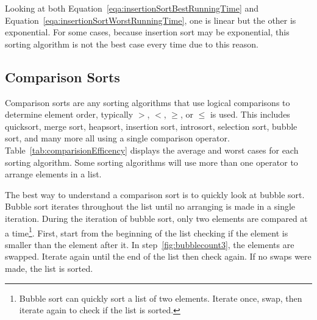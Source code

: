 \documentclass[12pt]{article}
\begin{document}
	Looking at both Equation~\ref{eqa:insertionSortBestRunningTime} and Equation~\ref{eqa:insertionSortWorstRunningTime}, one is linear but the other is exponential.
	For some cases, because insertion sort may be exponential, this sorting algorithm is not the best case every time due to this reason.
	
	\subsection{Comparison Sorts}
	\label{CompSort}
	Comparison sorts are any sorting algorithms that use logical comparisons to determine element order, typically $>$, $<$, $\ge$, or $\le$ is used.
	This includes quicksort, merge sort, heapsort, insertion sort, introsort, selection sort, bubble sort, and many more all using a single comparison operator.
	Table~\ref{tab:comparisionEfficency} displays the average and worst cases for each sorting algorithm.
	Some sorting algorithms will use more than one operator to arrange elements in a list.
	
	The best way to understand a comparison sort is to quickly look at bubble sort.
	Bubble sort iterates throughout the list until no arranging is made in a single iteration.
	During the iteration of bubble sort, only two elements are compared at a time\footnote{Bubble sort can quickly sort a list of two elements. Iterate once, swap, then iterate again to check if the list is sorted.}.
	First, start from the beginning of the list checking if the element is smaller than the element after it.
	In step~\ref{fig:bubblecount3}, the elements are swapped.
	Iterate again until the end of the list then check again.
	If no swaps were made, the list is sorted.
	
\end{document}
